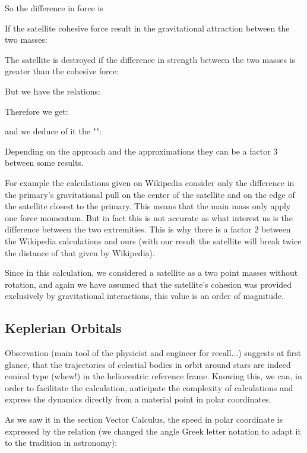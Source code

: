 	So the difference in force is
	
	If the satellite cohesive force result in the gravitational attraction between the two masses:
	
	The satellite is destroyed if the difference in strength between the two masses is greater than the cohesive force:
	
	But we have the relations:
	
	Therefore we get:
	
	and we deduce of it the "":
	
	Depending on the approach and the approximations they can be a factor $3$ between some results.
	\begin{tcolorbox}[title=Remark,colframe=black,arc=10pt]
	For example the calculations given on Wikipedia consider only the difference in the primary's gravitational pull on the center of the satellite and on the edge of the satellite closest to the primary. This means that the main mass only apply one force momentum. But in fact this is not accurate as what interest us is the difference between the two extremities. This is why there is a factor $2$ between the Wikipedia calculations and ours (with our result the satellite will break twice the distance of that given by Wikipedia).
	\end{tcolorbox}
	
	Since in this calculation, we considered a satellite as a two point masses without rotation, and again we have assumed that the satellite's cohesion was provided exclusively by gravitational interactions, this value is an order of magnitude.
	
	\pagebreak
	\subsection{Keplerian Orbitals}\label{keplerian orbitals}
	Observation (main tool of the physicist and engineer for recall...) suggests at first glance, that the trajectories of celestial bodies in orbit around stars are indeed conical type (whew!) in the heliocentric reference frame. Knowing this, we can, in order to facilitate the calculation, anticipate the complexity of calculations and express the dynamics directly from a material point in polar coordinates.

	As we saw it in the section Vector Calculus, the speed in polar coordinate is expressed by the relation (we changed the angle Greek letter notation to adapt it to the tradition in astronomy):
	

